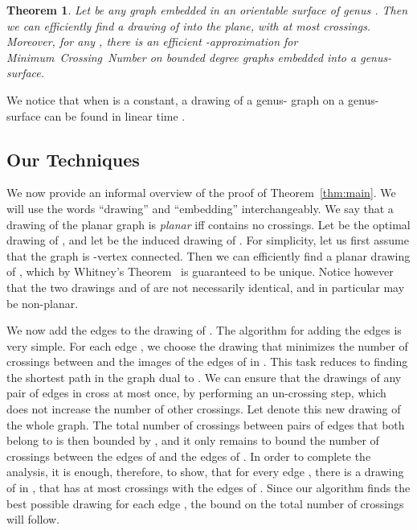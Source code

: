 \documentclass[twoside,leqno,twocolumn]{article}
\newtheorem{theorem}{Theorem}
\newcommand{\MCN}{\mbox{\sf Minimum Crossing Number}\xspace}
\begin{document}
\begin{theorem}\label{thm: bounded genus}
Let  be any graph embedded in an orientable surface of genus .
Then we can efficiently find a drawing of  into the plane, with at most  crossings.
Moreover, for any , there is an efficient -approximation for \MCN on bounded degree graphs embedded into a genus- surface.
\end{theorem}

We notice that when  is a constant, a drawing of a genus- graph on a genus- surface can be found in linear time \cite{Mohar99, KawarabayashiMR08}.


\subsection{Our Techniques}
We now provide an informal overview of the proof of Theorem~\ref{thm:main}. We will use the words ``drawing'' and ``embedding'' interchangeably.
We say that a drawing  of the planar graph  is \emph{planar} iff  contains no crossings. Let  be the optimal drawing of , and let  be the induced drawing of .
For simplicity, let us first assume that the graph  is -vertex connected. 
Then we can efficiently find a planar drawing  of , which by Whitney's Theorem~\cite{Whitney} is guaranteed to be unique.
Notice however that the two drawings  and  of  are not necessarily identical, and in particular  may be non-planar. 

We now add the edges  to the drawing  of . The algorithm for adding the edges is very simple. 
For each edge , we  choose the drawing  that minimizes the number of crossings between  and the images of the edges of  in . This task reduces to finding the shortest path in the graph dual to .
We can ensure that the drawings of any pair  of edges in  cross at most once, by performing an un-crossing step, which does not increase the number of other crossings. Let  denote this new drawing of the whole graph. The total number of crossings between pairs of edges that both belong to  is then bounded by , and it only remains to  bound the number of crossings between the edges of  and the edges of . In order to complete the analysis,
it is enough, therefore, to show, that for every edge , there is a drawing of  in ,  
that has at most  crossings with the edges of .
Since our algorithm finds the best possible drawing for each edge , the bound on the total number of crossings will follow.
\end{document}

